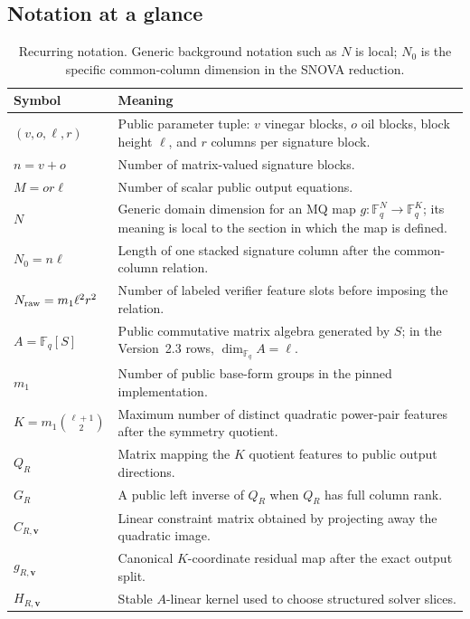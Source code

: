 \documentclass[11pt]{article}
\newcommand{\F}{\mathbb F}
\newcommand{\SNOVA}{\textsf{SNOVA}}
\begin{document}
\subsection{Notation at a glance}\label{sec:notation}

\begin{table}[H]
\centering
\caption{Recurring notation.  Generic background notation such as $N$ is local;
$N_0$ is the specific common-column dimension in the \SNOVA{} reduction.}
\label{tab:notation}
\small
\renewcommand{\arraystretch}{1.12}
\begin{tabularx}{0.96\textwidth}{@{}>{\raggedright\arraybackslash}p{}X@{}}
\toprule
Symbol & Meaning\\
\midrule
$(v,o,\ell,r)$ & Public parameter tuple: $v$ vinegar blocks, $o$ oil blocks,
block height $\ell$, and $r$ columns per signature block.\\
$n=v+o$ & Number of matrix-valued signature blocks.\\
$M=or\ell$ & Number of scalar public output equations.\\
$N$ & Generic domain dimension for an MQ map $g:\F_q^N\to\F_q^K$; its
meaning is local to the section in which the map is defined.\\
$N_0=n\ell$ & Length of one stacked signature column after the common-column
relation.\\
$N_{\rm raw}=m_1\ell^2r^2$ & Number of labeled verifier feature slots before imposing
the relation.\\
$A=\F_q[S]$ & Public commutative matrix algebra generated by $S$; in the
Version~2.3 rows, $\dim_{\F_q}A=\ell$.\\
$m_1$ & Number of public base-form groups in the pinned implementation.\\
$K=m_1\binom{\ell+1}{2}$ & Maximum number of distinct quadratic power-pair
features after the symmetry quotient.\\
$Q_R$ & Matrix mapping the $K$ quotient features to public output directions.\\
$G_R$ & A public left inverse of $Q_R$ when $Q_R$ has full column rank.\\
$C_{R,\mathbf v}$ & Linear constraint matrix obtained by projecting away the quadratic
image.\\
$g_{R,\mathbf v}$ & Canonical $K$-coordinate residual map after the exact output split.\\
$H_{R,\mathbf v}$ & Stable $A$-linear kernel used to choose structured solver slices.\\

\end{tabularx}
\end{table}
\end{document}

